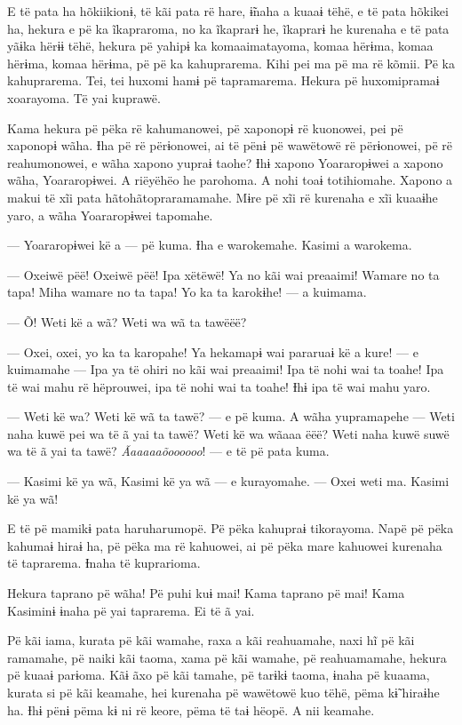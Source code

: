 E të pata ha hõkiikionɨ, të kãi pata rë hare, ɨ̃naha a kuaaɨ tëhë, e të
pata hõkikei ha, hekura e pë ka ĩkapraroma, no ka ĩkaprarɨ he, ĩkaprarɨ
he kurenaha e të pata yãɨka hërɨɨ tëhë, hekura pë yahipɨ ka
komaaimatayoma, komaa hërɨma, komaa hërɨma, komaa hërɨma, pë pë ka
kahuprarema. Kihi pei ma pë ma rë kõmii. Pë ka kahuprarema. Tei, tei
huxomi hamɨ pë tapramarema. Hekura pë huxomipramaɨ xoarayoma. Të yai
kuprawë. 

Kama hekura pë pëka rë kahumanowei, pë xaponopɨ rë kuonowei, pei pë
xaponopɨ wãha. Ɨha pë rë përɨonowei, ai të pënɨ pë wawëtowë rë
përɨonowei, pë rë reahumonowei, e wãha xapono yupraɨ taohe? Ɨhɨ xapono
Yoararopɨwei a xapono wãha, Yoararopɨwei. A riëyëhëo he parohoma. A nohi
toaɨ totihiomahe. Xapono a makui të xĩi pata hãtohãtopraramamahe. Mɨre
pë xĩi rë kurenaha e xĩi kuaaɨhe yaro, a wãha Yoararopɨwei tapomahe. 

--- Yoararopɨwei kë a --- pë kuma. Ɨha e warokemahe. Kasimi a warokema. 

--- Oxeiwë pëë! Oxeiwë pëë! Ipa xëtëwë! Ya no kãi wai preaaimi! Wamare
no ta tapa! Miha wamare no ta tapa! Yo ka ta karokɨhe! --- a kuimama. 

--- Õ! Weti kë a wã? Weti wa wã ta tawëëë?

--- Oxei, oxei, yo ka ta karopahe! Ya hekamapɨ wai pararuaɨ kë a kure!
--- e kuimamahe --- Ipa ya të ohiri no kãi wai preaaimi! Ipa të nohi wai
ta toahe! Ipa të wai mahu rë hëprouwei, ipa të nohi wai ta toahe! Ɨhɨ
ipa të wai mahu yaro. 

--- Weti kë wa? Weti kë wã ta tawë? --- e pë kuma. A wãha yupramapehe
--- Weti naha kuwë pei wa të ã yai ta tawë? Weti kë wa wãaaa ëëë? Weti
naha kuwë suwë wa të ã yai ta tawë? \textit{Ãaaaaaõoooooo}! --- e të pë pata
kuma. 

--- Kasimi kë ya wã, Kasimi kë ya wã --- e kurayomahe. --- Oxei weti ma.
Kasimi kë ya wã! 

E të pë mamikɨ pata haruharumopë. Pë pëka kahupraɨ tikorayoma. Napë pë
 pëka kahumaɨ hiraɨ ha, pë pëka ma rë kahuowei, ai pë pëka mare kahuowei
 kurenaha të taprarema. Ɨnaha të kuprarioma.

Hekura taprano pë wãha! Pë puhi kuɨ mai! Kama taprano pë mai! Kama
Kasiminɨ ɨnaha pë yai taprarema. Ei të ã yai. 

Pë kãi iama, kurata pë kãi wamahe, raxa a kãi reahuamahe, naxi hĩ pë kãi
ramamahe, pë naiki kãi taoma, xama pë kãi wamahe, pë reahuamamahe,
hekura pë kuaaɨ parɨoma. Kãɨ ãxo pë kãi tamahe, pë tarɨkɨ taoma, ɨnaha
pë kuaama, kurata si pë kãi keamahe, hei kurenaha pë wawëtowë kuo tëhë,
pëma kɨ̃ hiraɨhe ha. Ɨhɨ pënɨ pëma kɨ ni rë keore, pëma të taɨ hëopë. A nii keamahe. 


